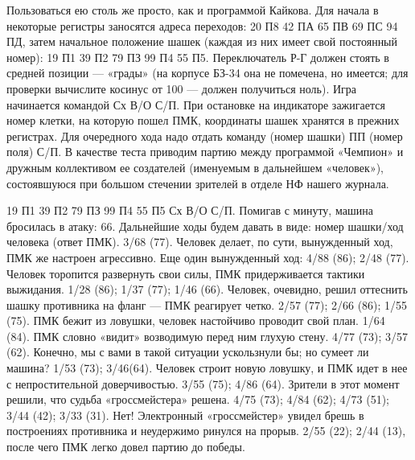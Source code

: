 \documentclass[11pt,a4paper,oneside]{article}
\begin{document}
Пользоваться ею столь же просто, как и программой Кайкова. Для начала в некоторые регистры заносятся адреса переходов: 20 П8 42 ПА 65 ПВ 69 ПС 94 ПД, затем начальное положение шашек (каждая из них имеет свой постоянный номер): 19 П1 39 П2 79 ПЗ 99 П4 55 П5. Переключатель Р-Г должен стоять в средней позиции — «грады» (на корпусе БЗ-34 она не помечена, но имеется; для проверки вычислите косинус от 100 — должен получиться ноль). Игра начинается командой Сх В/О С/П. При остановке на индикаторе зажигается номер клетки, на которую пошел ПМК, координаты шашек хранятся в прежних регистрах. Для очередного хода надо отдать команду (номер шашки) ПП (номер поля) С/П. В качестве теста приводим партию между программой «Чемпион» и дружным коллективом ее создателей (именуемым в дальнейшем «человек»), состоявшуюся при большом стечении зрителей в отделе НФ нашего журнала.

19 П1 39 П2 79 ПЗ 99 П4 55 П5 Сх В/О С/П. Помигав с минуту, машина бросилась в атаку: 66. Дальнейшие ходы будем давать в виде: номер шашки/ход человека (ответ ПМК). 3/68 (77). Человек делает, по сути, вынужденный ход, ПМК же настроен агрессивно. Еще один вынужденный ход: 4/88 (86); 2/48 (77). Человек торопится развернуть свои силы, ПМК придерживается тактики выжидания. 1/28 (86); 1/37 (77); 1/46 (66). Человек, очевидно, решил оттеснить шашку противника на фланг — ПМК реагирует четко. 2/57 (77); 2/66 (86); 1/55 (75). ПМК бежит из ловушки, человек настойчиво проводит свой план. 1/64 (84). ПМК словно «видит» возводимую перед ним глухую стену. 4/77 (73); 3/57 (62). Конечно, мы с вами в такой ситуации ускользнули бы; но сумеет ли машина? 1/53 (73); 3/46(64). Человек строит новую ловушку, и ПМК идет в нее с непростительной доверчивостью. 3/55 (75); 4/86 (64). Зрители в этот момент решили, что судьба «гроссмейстера» решена. 4/75 (73); 4/84 (62); 4/73 (51); 3/44 (42); 3/33 (31). Нет! Электронный «гроссмейстер» увидел брешь в построениях противника и неудержимо ринулся на прорыв. 2/55 (22); 2/44 (13), после чего ПМК легко довел партию до победы.
\end{document}
